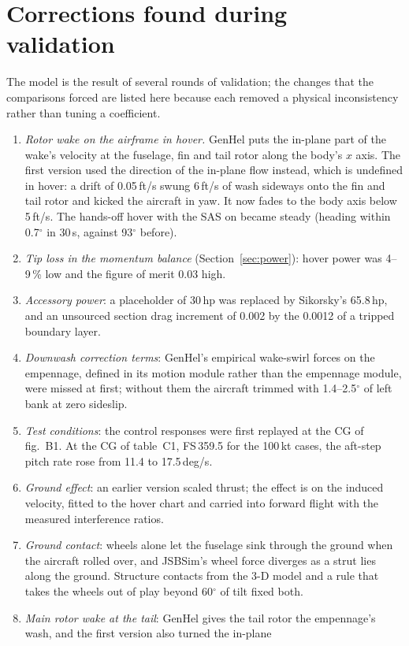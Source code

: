 \documentclass[10pt,a4paper,twocolumn]{article}
\begin{document}
\section{Corrections found during validation}\label{sec:review}
The model is the result of several rounds of validation; the changes that the comparisons forced are listed here because each
removed a physical inconsistency rather than tuning a coefficient.
\begin{enumerate}
\item \emph{Rotor wake on the airframe in hover.} GenHel puts the in-plane part of the wake's velocity at the fuselage, fin and tail rotor along the body's
$x$ axis. The first version used the direction of the in-plane flow instead, which is undefined in hover: a drift of 0.05\,ft/s
swung 6\,ft/s of wash sideways onto the fin and tail rotor and kicked the aircraft in yaw. It now fades to the body axis below 5\,ft/s.
The hands-off hover with the SAS on became steady (heading within 0.7$^\circ$ in 30\,s, against 93$^\circ$ before).
\item \emph{Tip loss in the momentum balance} (Section~\ref{sec:power}): hover power was 4--9\,\% low and the figure of merit 0.03 high.
\item \emph{Accessory power}: a placeholder of 30\,hp was replaced by Sikorsky's 65.8\,hp, and an unsourced section drag increment of 0.002
by the 0.0012 of a tripped boundary layer.
\item \emph{Downwash correction terms}: GenHel's empirical wake-swirl forces on the empennage, defined in its motion module rather than the
empennage module, were missed at first; without them the aircraft trimmed with 1.4--2.5$^\circ$ of left bank at zero sideslip.
\item \emph{Test conditions}: the control responses were first replayed at the CG of fig.~B1. At the CG of table~C1, FS\,359.5 for the 100\,kt cases,
the aft-step pitch rate rose from 11.4 to 17.5\,deg/s.
\item \emph{Ground effect}: an earlier version scaled thrust; the effect is on the induced velocity, fitted to the hover chart and carried into
forward flight with the measured interference ratios.
\item \emph{Ground contact}: wheels alone let the fuselage sink through the ground when the aircraft rolled over, and JSBSim's wheel force diverges
as a strut lies along the ground. Structure contacts from the 3-D model and a rule that takes the wheels out of play beyond 60$^\circ$ of tilt fixed both.
\item \emph{Main rotor wake at the tail}: GenHel gives the tail rotor the empennage's wash, and the first version also turned the in-plane

\end{enumerate}
\end{document}
